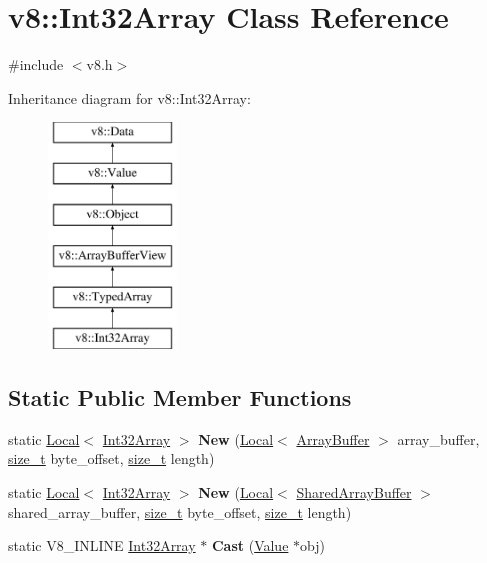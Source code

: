 \hypertarget{classv8_1_1Int32Array}{}\section{v8\+:\+:Int32\+Array Class Reference}
\label{classv8_1_1Int32Array}


{\ttfamily \#include $<$v8.\+h$>$}

Inheritance diagram for v8\+:\+:Int32\+Array\+:\begin{figure}[H]
\begin{center}
\leavevmode
\includegraphics[height=6.000000cm]{classv8_1_1Int32Array}
\end{center}
\end{figure}
\subsection*{Static Public Member Functions}
\begin{DoxyCompactItemize}
\item 
\mbox{\label{classv8_1_1Int32Array_a03adbd44725e3325d10bcc448e8bfd75}} 
static \mbox{\hyperlink{classv8_1_1Local}{Local}}$<$ \mbox{\hyperlink{classv8_1_1Int32Array}{Int32\+Array}} $>$ {\bfseries New} (\mbox{\hyperlink{classv8_1_1Local}{Local}}$<$ \mbox{\hyperlink{classv8_1_1ArrayBuffer}{Array\+Buffer}} $>$ array\+\_\+buffer, \mbox{\hyperlink{classsize__t}{size\+\_\+t}} byte\+\_\+offset, \mbox{\hyperlink{classsize__t}{size\+\_\+t}} length)
\item 
\mbox{\label{classv8_1_1Int32Array_acf112fc9df4e0bf2791be73264779905}} 
static \mbox{\hyperlink{classv8_1_1Local}{Local}}$<$ \mbox{\hyperlink{classv8_1_1Int32Array}{Int32\+Array}} $>$ {\bfseries New} (\mbox{\hyperlink{classv8_1_1Local}{Local}}$<$ \mbox{\hyperlink{classv8_1_1SharedArrayBuffer}{Shared\+Array\+Buffer}} $>$ shared\+\_\+array\+\_\+buffer, \mbox{\hyperlink{classsize__t}{size\+\_\+t}} byte\+\_\+offset, \mbox{\hyperlink{classsize__t}{size\+\_\+t}} length)
\item 
\mbox{\label{classv8_1_1Int32Array_afe7cdf534deadc3d872d8a43778809f1}} 
static V8\+\_\+\+I\+N\+L\+I\+NE \mbox{\hyperlink{classv8_1_1Int32Array}{Int32\+Array}} $\ast$ {\bfseries Cast} (\mbox{\hyperlink{classv8_1_1Value}{Value}} $\ast$obj)
\end{DoxyCompactItemize}

